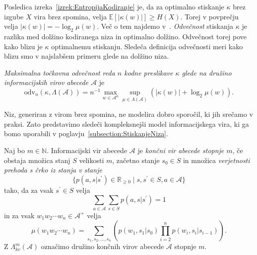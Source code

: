 \documentclass[fin1, tisk]{fmfdelo}
\providecommand{\abs}[1]{\left\lvert #1 \right\rvert}
\newcommand{\N}{\mathbb{N}}
\newcommand{\R}{\mathbb{R}}
\newcommand{\E}{\mathbb{E}}
\newcommand{\A}{\mathcal{A}}
\theoremstyle{definition}
\begin{document}
Posledica izreka~\ref{izrek:EntropijaKodiranje} je, da za optimalno stiskanje $\kappa$ brez 
izgube $X$ vira brez spomina, velja $\E[\abs{\kappa(w)}] \geq H(X)$.
Torej v povprečju velja $\abs{\kappa(w)} = - \log_2\mu(w)$. Več o tem najdemo 
v~\cite[1. poglavje, 5. razdelek]{Mackay2003}. \emph{Odvečnost} stiskanja $\kappa$
je razlika med dolžino kodiranega niza in optimalno dolžino. Odvečnost torej pove kako
blizu je $\kappa$ optimalnemu stiskanju. Sledeča definicija odvečnosti meri kako blizu smo
v najslabšem primeru glede na dolžino niza.

\begin{definicija}\label{def:odv}
    \emph{Maksimalna točkovna odvečnost reda $n$ kodne preslikave $\kappa$ glede na družino 
    informacijskih virov abecede $\A$} je
    \[
        \text{odv}_{n} \left( \kappa, \Lambda(\A) \right) = n^{-1} \max_{w \in \A^n} \sup_{\mu \in \Lambda(\A)}
        \left( \abs{\kappa(w)} + \log_2 \mu(w) \right).
    \]
\end{definicija}

Niz, generiran z virom brez spomina, ne modelira dobro sporočil, ki jih srečamo v
praksi. Zato predstavimo sledeči kompleksnejši model informacijskega vira, ki ga bomo uporabili
v poglavju~\ref{subsection:StiskanjeNiza}.

\begin{definicija}\label{def:FSS} %
    Naj bo $m \in \N$. Informacijski vir abecede $\A$ je 
    \emph{končni vir abecede stopnje $m$}, če obstaja množica stanj $S$ velikosti $m$, 
    začetno stanje $s_0 \in S$ in množica \emph{verjetnosti prehoda s črko iz stanja v stanje}
    \[
        \{ p(a, s|s^\prime) \in \R_{\geq 0} \mid s, s^\prime \in S, a \in \A \}
    \] 
    tako, da za vsak $s^\prime \in S$ velja
    \[
        \sum_{a \in \A} \sum_{s \in S} p(a, s|s^\prime) = 1
    \]
    in za vsak $w_1w_2 \cdots w_n \in \A^+$ velja
    \[
        \mu(w_1w_2 \cdots w_n) = \sum_{s_1, s_2, \ldots, s_n} 
        \left( p(w_1,s_1|s_0) \prod_{i=2}^{n} p(w_i, s_i|s_{i-1}) \right).
    \]
    Z $\Lambda_{kv}^m(\A)$ označimo družino končnih virov abecede $\A$ stopnje $m$.
\end{definicija}
\end{document}
